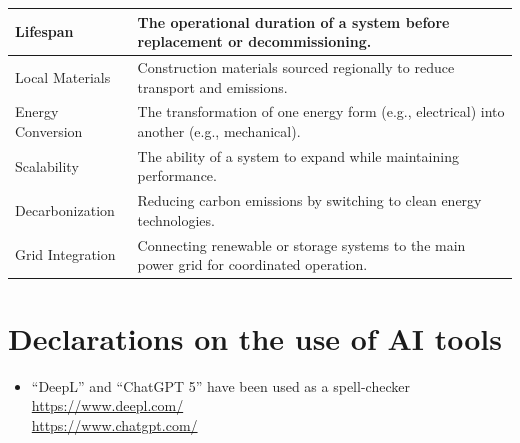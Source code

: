 \documentclass{article}
\begin{document}
\begin{table}[ht!]
\begin{tabularx}{\textwidth}{|l|X|}
        \hline
        Lifespan & The operational duration of a system before replacement or decommissioning. \\
        \hline
        Local Materials & Construction materials sourced regionally to reduce transport and emissions. \\
        \hline
        Energy Conversion & The transformation of one energy form (e.g., electrical) into another (e.g., mechanical). \\
        \hline
        Scalability & The ability of a system to expand while maintaining performance. \\
        \hline
        Decarbonization & Reducing carbon emissions by switching to clean energy technologies. \\
        \hline
        Grid Integration & Connecting renewable or storage systems to the main power grid for coordinated operation. \\
        \hline
    \end{tabularx}
\end{table}

\newpage
\section*{Declarations on the use of AI tools}
\begin{itemize}
    \item ``DeepL'' and ``ChatGPT 5'' have been used as a spell-checker \\
        \url{https://www.deepl.com/}\\
        \url{https://www.chatgpt.com/}
\end{itemize}

\listoffigures

\setlength{\bibitemsep}{1.2\baselineskip}
\printbibliography[title={References}]
\end{document}
